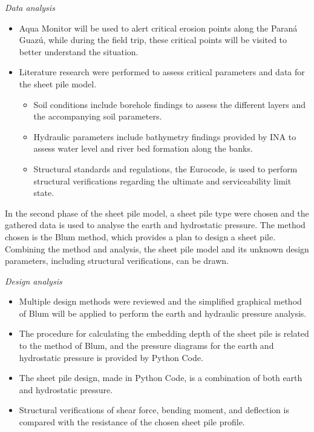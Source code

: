 \textit{Data analysis}

\begin{itemize}
    \item Aqua Monitor will be used to alert critical erosion points along the Paraná Guazú, while during the field trip, these critical points will be visited to better understand the situation.
    \item Literature research were performed to assess critical parameters and data for the sheet pile model.
    \begin{itemize}
        \item Soil conditions include borehole findings to assess the different layers and the accompanying soil parameters.
        \item Hydraulic parameters include bathymetry findings provided by INA to assess water level and river bed formation along the banks.
        \item Structural standards and regulations, the Eurocode, is used to perform structural verifications regarding the ultimate and serviceability limit state.
    \end{itemize}
\end{itemize}   

In the second phase of the sheet pile model, a sheet pile type were chosen and the gathered data is used to analyse the earth and hydrostatic pressure. The method chosen is the Blum method, which provides a plan to design a sheet pile. Combining the method and analysis, the sheet pile model and its unknown design parameters, including structural verifications, can be drawn. 

\textit{Design analysis}

\begin{itemize}
    \item Multiple design methods were reviewed and the simplified graphical method of Blum will be applied to perform the earth and hydraulic pressure analysis.
    \item The procedure for calculating the embedding depth of the sheet pile is related to the method of Blum, and the pressure diagrams for the earth and hydrostatic pressure is provided by Python Code.
    \item The sheet pile design, made in Python Code, is a combination of both earth and hydrostatic pressure.
    \item Structural verifications of shear force, bending moment, and deflection is compared with the resistance of the chosen sheet pile profile.
\end{itemize}

